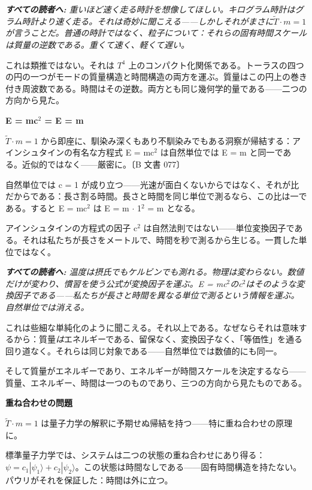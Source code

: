 \documentclass[11pt,openany]{book}
\newenvironment{laierspur}{%
  \par\vspace{4pt}%
  \noindent\small\itshape\color{blue!60!black}%
  \textbf{すべての読者へ:}\enspace\ignorespaces}{%
  \par\vspace{4pt}\normalsize\normalfont\normalcolor}
\begin{document}
\begin{laierspur}
重いほど速く走る時計を想像してほしい。キログラム時計はグラム時計より速く走る。それは奇妙に聞こえる——しかしそれがまさに$\tilde{T}\cdot m = 1$が言うことだ。普通の時計ではなく、粒子について：それらの固有時間スケールは質量の逆数である。重くて速く、軽くて遅い。
\end{laierspur}

これは類推ではない。それは $T^4$ 上のコンパクト化関係である。トーラスの四つの円の一つがモードの質量構造と時間構造の両方を運ぶ。質量はこの円上の巻き付き周波数である。時間はその逆数。両方とも同じ幾何学的量である——二つの方向から見た。

\textbf{E = mc$^2$ = E = m}

$\tilde{T}\cdot m = 1$ から即座に、馴染み深くもあり不馴染みでもある洞察が帰結する：アインシュタインの有名な方程式 E = mc$^2$ は自然単位では E = m と同一である。近似的ではなく——厳密に。〔B 文書 077〕

自然単位では c = 1 が成り立つ——光速が面白くないからではなく、それが比だからである：長さ割る時間。長さと時間を同じ単位で測るなら、この比は一である。すると E = mc$^2$ は E = m $\cdot$ 1$^2$ = m となる。

アインシュタインの方程式の因子 c$^2$ は自然法則ではない——単位変換因子である。それは私たちが長さをメートルで、時間を秒で測るから生じる。一貫した単位ではなく。

\begin{laierspur}
温度は摂氏でもケルビンでも測れる。物理は変わらない。数値だけが変わり、慣習を使う公式が変換因子を運ぶ。E = mc$^2$のc$^2$はそのような変換因子である——私たちが長さと時間を異なる単位で測るという情報を運ぶ。自然単位では消える。
\end{laierspur}

これは些細な単純化のように聞こえる。それ以上である。なぜならそれは意味するから：質量\textit{は}エネルギーである、留保なく、変換因子なく、「等価性」を通る回り道なく。それらは同じ対象である——自然単位では数値的にも同一。

そして質量がエネルギーであり、エネルギーが時間スケールを決定するなら——質量、エネルギー、時間は一つのものであり、三つの方向から見たものである。

\textbf{重ね合わせの問題}

$\tilde{T}\cdot m = 1$ は量子力学の解釈に予期せぬ帰結を持つ——特に重ね合わせの原理に。

標準量子力学では、システムは二つの状態の重ね合わせにあり得る：$\psi = c_1|\psi_1\rangle + c_2|\psi_2\rangle$。この状態は時間なしである——固有時間構造を持たない。パウリがそれを保証した：時間は外に立つ。
\end{document}
